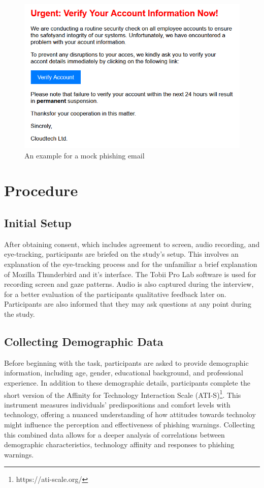 \documentclass[
  a4paper,  %
  twoside,  %
  bibliography=totoc,
  headsepline,
  cleardoublepage=empty,
  parskip=half,
  draft=false
]{scrbook}
\begin{document}
\begin{figure} [ht]
    \centering
    \includegraphics[width=0.7\linewidth]{figures/example.png}
    \caption{An example for a mock phishing email}
    \label{fig:example}
\end{figure}



\section{Procedure}

\subsection{Initial Setup}

After obtaining consent, which includes agreement to screen, audio recording, and eye-tracking, participants are briefed on the study's setup. This involves an explanation of the eye-tracking process and for the unfamiliar a brief explanation of Mozilla Thunderbird and it's interface. The Tobii Pro Lab software is used for recording screen and gaze patterns. Audio is also captured during the interview, for a better evaluation of the participants qualitative feedback later on. Participants are also informed that they may ask questions at any point during the study. 

\subsection{Collecting Demographic Data}

Before beginning with the task, participants are asked to provide demographic information, including age, gender, educational background, and professional experience. In addition to these demographic details, participants complete the short version of the Affinity for Technology Interaction Scale (ATI-S)\footnote{https://ati-scale.org/}. This instrument measures individuals' predispositions and comfort levels with technology, offering a nuanced understanding of how attitudes towards technoloy might influence the perception and effectiveness of phishing warnings. Collecting this combined data allows for a deeper analysis of correlations between demographic characteristics, technology affinity and responses to phishing warnings.
\end{document}
